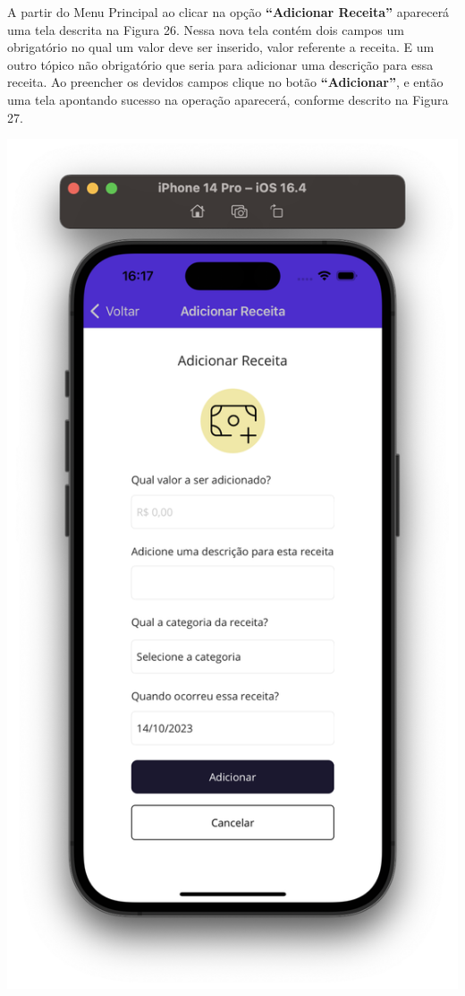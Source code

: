 A partir do Menu Principal ao clicar na opção \textbf{“Adicionar Receita”} aparecerá uma tela descrita na Figura 26. Nessa nova tela contém dois campos um obrigatório no qual um valor deve ser inserido, valor referente a receita. E um outro tópico não obrigatório que seria para adicionar uma descrição para essa receita. Ao preencher os devidos campos clique no botão \textbf{“Adicionar”}, e então uma tela apontando sucesso na operação aparecerá, conforme descrito na Figura 27. 

    \vspace{\baselineskip}
    \begin{center}
        \begin{minipage}{0.4\textwidth}
            \centering
            \includegraphics[scale=0.15]{figs/figura26.png}

\end{minipage}
\end{center}
